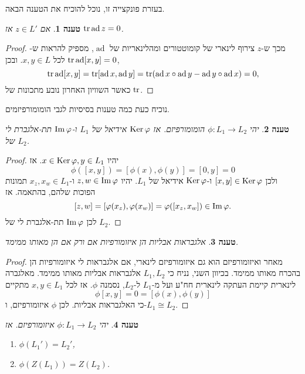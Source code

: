 \documentclass{report}
\theoremstyle{break}
\newtheorem{preposition}[preposition]{טענה}
\theoremstyle{MyNonumberbreak}
\newtheorem{proof}{הוכחה}
\DeclareMathOperator{\ad}{ad} %
\begin{document}
בעזרת פונקצייה זו, נוכל להוכיח את הטענה הבאה.
\begin{preposition} \label{prep:traceAd}
	אם $z \in L'$ אז $\Tr\ad z = 0$.
\end{preposition}
\begin{proof}
	מכך ש-$z$ צירוף לינארי של קומוטטורים ומהלינאריות של $\ad$, מספיק להראות ש-$\Tr\ad[x, y] = 0$ לכל $x, y \in L$. ובכן,
	\[ \Tr\ad [x, y] = \Tr[\ad x, \ad y] = \Tr(\ad x \circ \ad y - \ad y \circ \ad x) = 0, \]
	כאשר השוויון האחרון נובע מתכונות של $\operatorname{tr}$.
\end{proof}
נוכיח כעת כמה טענות בסיסיות לגבי הומומורפיזמים.
\begin{preposition} \label{prep:ker-img-hom}
	יהי $\phi : L_1 \to L_2$ הומומורפיזם. אז $\operatorname{Ker}\varphi$ אידיאל של $L_1$ ו-$\operatorname{Im}\varphi$ תת-אלגברת לי של $L_2$.
\end{preposition}
\begin{proof}
	יהיו $x \in \operatorname{Ker}\varphi, y \in L_1$. אז
	\[ \phi([x, y]) = [\phi(x), \phi(y)] = [0, y] = 0 \]
	ולכן $[x, y] \in \operatorname{Ker}\varphi$ ו-$\operatorname{Ker}\varphi$ אידיאל של $L_1$. יהיו $z, w \in \operatorname{Im}\varphi$ ו-$x_z, x_w \in L_1$ תמונות הפוכות שלהם, בהתאמה. אז
	\[ [z, w] = [\varphi(x_z), \varphi(x_w)] = \varphi([x_z, x_w]) \in \operatorname{Im}\varphi. \]
	לכן $\operatorname{Im}\varphi$ תת-אלגברת לי של $L_2$.
\end{proof}
\begin{preposition}\label{prep:abelain}
	אלגבראות אבליות הן איזומורפיות אם ורק אם הן מאותו ממימד.
\end{preposition}
\begin{proof}
	מאחר ואיזומורפיזם הוא גם איזומורפיזם לינארי, אם אלגבראות לי איזומורפיות הן בהכרח מאותו ממימד. בכיוון השני, נניח כי $L_1, L_2$ אלגבראות אבליות מאותו ממימד. מאלגברה לינארית קיימת העתקה לינארית חח"ע ועל מ-$L_1$ ל-$L_2$, נסמנה $\phi$. אז לכל $x, y \in L_1$ מתקיים
	\[ \phi[x, y] = 0 = [\phi(x), \phi(y)] \]
	כי האלגבראות אבליות. לכן $\phi$ איזומורפיזם, ו-$L_1 \cong L_2$.
\end{proof}
\begin{preposition} \label{prep:invariance-centre-derived}
	יהי $\phi : L_1 \to L_2$ איזומורפיזם. אז
	\begin{enumerate}
		\item $\phi(L_1') = L_2'$,
		\item $\phi(Z(L_1)) = Z(L_2)$.
	\end{enumerate}
\end{preposition}
\end{document}
